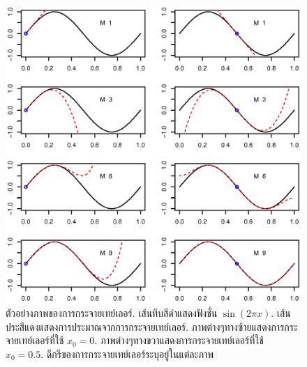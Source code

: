 %
\begin{figure}
\begin{center}
\includegraphics[width=5.5in]{02Background/bgTaylorSine.eps}
\end{center}
\caption{ตัวอย่างภาพของการกระจายเทย์เลอร์.
เส้นทึบสีดำแสดงฟังชั่น $\sin(2 \pi x)$. 
เส้นประสีแดงแสดงการประมาณจากการกระจายเทย์เลอร์.
ภาพต่างๆทางซ้ายแสดงการกระจายเทย์เลอร์ที่ใช้ $x_0 = 0$.
ภาพต่างๆทางขวาแสดงการกระจายเทย์เลอร์ที่ใช้ $x_0 = 0.5$.
ดีกรีของการกระจายเทย์เลอร์ระบุอยู่ในแต่ละภาพ}
\label{fig: bg taylor}
\end{figure}
%


